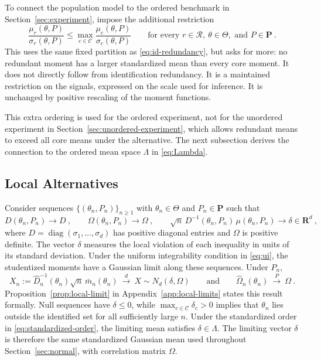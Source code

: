 \documentclass[11pt]{article}
\newcommand{\red}[1]{{\color{red}#1}} %
\numberwithin{equation}{section}
\theoremstyle{definition}
\begin{document}
To connect the population model to the ordered benchmark in Section~\ref{sec:experiment}, impose the additional restriction
\begin{equation}\label{eq:standardized-order}
\frac{\mu_r(\theta,P)}{\sigma_r(\theta,P)}\le\max_{c\in\mathcal C}\frac{\mu_c(\theta,P)}{\sigma_c(\theta,P)}
\qquad\text{for every }r\in\mathcal R,\ \theta\in\Theta,\text{ and }P\in\mathbf P~.
\end{equation}
This uses the same fixed partition as \eqref{eq:id-redundancy}, but asks for more: no redundant moment has a larger standardized mean than every core moment. It does not directly follow from identification redundancy. It is a maintained restriction on the signals, expressed on the scale used for inference. It is unchanged by positive rescaling of the moment functions.

This extra ordering is used for the \red{ordered} experiment, not for the \red{unordered} experiment in Section~\ref{sec:unordered-experiment}, which allows redundant means to exceed all core means under the alternative. The next subsection derives the connection to the ordered mean space $\Lambda$ in \eqref{eq:Lambda}.

\subsection{Local Alternatives}\label{sec:local}

Consider sequences $\{(\theta_n,P_n)\}_{n\ge1}$ with $\theta_n\in\Theta$ and $P_n\in\mathbf P$ such that
\begin{equation}\label{eq:local}
D(\theta_n,P_n)\to D~,
\qquad
\Omega(\theta_n,P_n)\to\Omega~,
\qquad
\sqrt n\,D^{-1}(\theta_n,P_n)\,\mu(\theta_n,P_n)\to \delta\in\mathbf R^d~,
\end{equation}
where $D=\operatorname{diag}(\sigma_1,\dots,\sigma_d)$ has positive diagonal entries and $\Omega$ is positive definite. The vector $\delta$ measures the local violation of each inequality in units of its standard deviation. Under the uniform integrability condition \red{in \eqref{eq:ui}}, the studentized moments have a Gaussian limit along these sequences. Under $P_n$,
\begin{equation}\label{eq:gaussian-limit}
X_n:=\hat D_n^{-1}(\theta_n)\sqrt n\,\bar m_n(\theta_n)\ \stackrel{d}{\to}\ X\sim N_d(\delta,\Omega)
\qquad\text{and}\qquad
\hat\Omega_n(\theta_n)\ \stackrel{P}{\to}\ \Omega~.
\end{equation}
Proposition~\ref{prop:local-limit} in Appendix~\ref{app:local-limits} states this result formally. Null sequences have $\delta\le0$, while $\max_{c\in\mathcal C}\delta_c>0$ implies that $\theta_n$ lies outside the identified set for all sufficiently large $n$. Under the standardized order in \eqref{eq:standardized-order}, the limiting mean satisfies $\delta\in\Lambda$. The limiting vector $\delta$ is therefore the same standardized Gaussian mean used throughout Section~\ref{sec:normal}, with correlation matrix $\Omega$.
\end{document}
